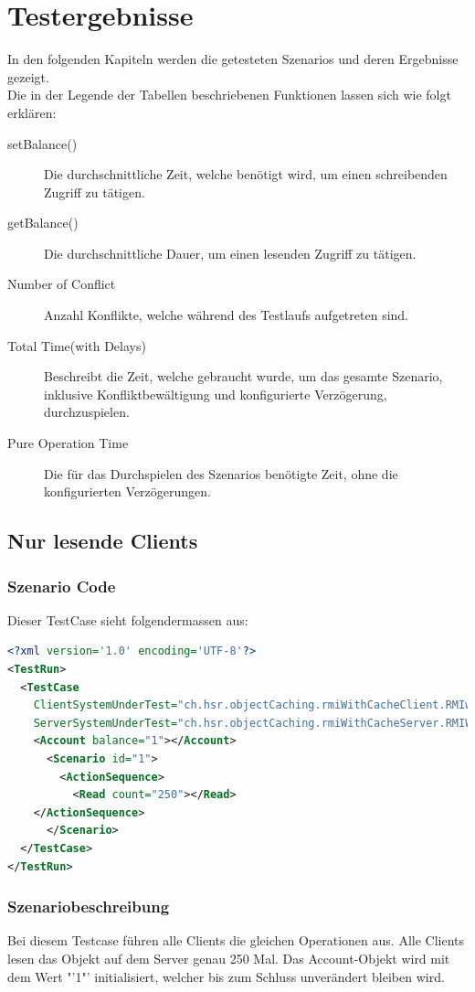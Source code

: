 \section{Testergebnisse}
In den folgenden Kapiteln werden die getesteten Szenarios und deren Ergebnisse gezeigt. \\
Die in der Legende der Tabellen beschriebenen Funktionen lassen sich wie folgt erklären:
\begin{description}
\item[setBalance()] Die durchschnittliche Zeit, welche benötigt wird, um einen schreibenden Zugriff zu tätigen.
\item[getBalance()] Die durchschnittliche Dauer, um einen lesenden Zugriff zu tätigen.
\item[Number of Conflict] Anzahl Konflikte, welche während des Testlaufs aufgetreten sind.
\item[Total Time(with Delays)] Beschreibt die Zeit, welche gebraucht wurde, um das gesamte Szenario, inklusive Konfliktbewältigung und konfigurierte Verzögerung, durchzuspielen.
\item[Pure Operation Time] Die für das Durchspielen des Szenarios benötigte Zeit, ohne die konfigurierten Verzögerungen.
\end{description}


\subsection{Nur lesende Clients}
\subsubsection{Szenario Code}
Dieser TestCase sieht folgendermassen aus:
\begin{lstlisting}[language=XML, breaklines=true]
<?xml version='1.0' encoding='UTF-8'?>
<TestRun>
  <TestCase
    ClientSystemUnderTest="ch.hsr.objectCaching.rmiWithCacheClient.RMIwithCacheClientSystem"
    ServerSystemUnderTest="ch.hsr.objectCaching.rmiWithCacheServer.RMIWithCacheServerSystem">
    <Account balance="1"></Account>
      <Scenario id="1">
        <ActionSequence>
          <Read count="250"></Read>
	</ActionSequence>
      </Scenario>
  </TestCase>
</TestRun>
\end{lstlisting}

\subsubsection{Szenariobeschreibung}
Bei diesem Testcase führen alle Clients die gleichen Operationen aus. Alle Clients lesen das Objekt auf dem Server genau 250 Mal. Das Account-Objekt wird mit dem Wert "'1"' initialisiert, welcher bis zum Schluss unverändert bleiben wird. 

